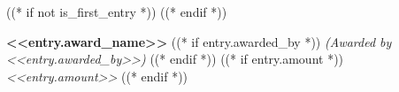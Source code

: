 ((* if not is_first_entry *))
\vspace{<<design.margins.entry_area.vertical_between>>}
((* endif *))

\begin{onecolentry}
    \textbf{<<entry.award_name>>} %
    ((* if entry.awarded_by *)) %
        \textit{ (Awarded by <<entry.awarded_by>>)} %
    ((* endif *))
    ((* if entry.amount *)) %
        \hfill \textit{<<entry.amount>>} %
    ((* endif *))
\end{onecolentry}